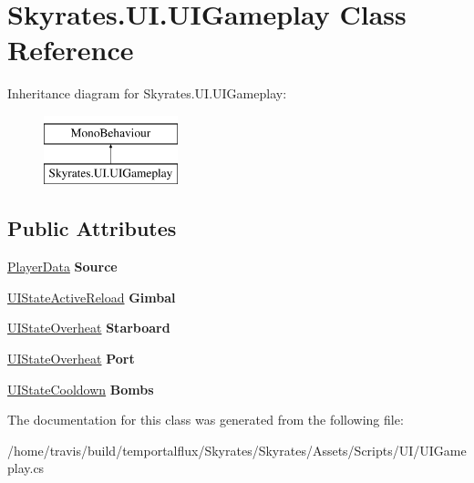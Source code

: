 \hypertarget{class_skyrates_1_1_u_i_1_1_u_i_gameplay}{\section{Skyrates.\-U\-I.\-U\-I\-Gameplay Class Reference}
\label{class_skyrates_1_1_u_i_1_1_u_i_gameplay}
}
Inheritance diagram for Skyrates.\-U\-I.\-U\-I\-Gameplay\-:\begin{figure}[H]
\begin{center}
\leavevmode
\includegraphics[height=2.000000cm]{class_skyrates_1_1_u_i_1_1_u_i_gameplay}
\end{center}
\end{figure}
\subsection*{Public Attributes}
\begin{DoxyCompactItemize}
\item 
\hypertarget{class_skyrates_1_1_u_i_1_1_u_i_gameplay_a4770e7e5a4ebc0922769fa4f42c1c565}{\hyperlink{class_skyrates_1_1_data_1_1_player_data}{Player\-Data} {\bfseries Source}}\label{class_skyrates_1_1_u_i_1_1_u_i_gameplay_a4770e7e5a4ebc0922769fa4f42c1c565}

\item 
\hypertarget{class_skyrates_1_1_u_i_1_1_u_i_gameplay_aeff98598be08416c64c7fbb642842b1b}{\hyperlink{class_skyrates_1_1_u_i_1_1_u_i_state_active_reload}{U\-I\-State\-Active\-Reload} {\bfseries Gimbal}}\label{class_skyrates_1_1_u_i_1_1_u_i_gameplay_aeff98598be08416c64c7fbb642842b1b}

\item 
\hypertarget{class_skyrates_1_1_u_i_1_1_u_i_gameplay_afa0b6d84a3974573ed8947861aa729b7}{\hyperlink{class_u_i_state_overheat}{U\-I\-State\-Overheat} {\bfseries Starboard}}\label{class_skyrates_1_1_u_i_1_1_u_i_gameplay_afa0b6d84a3974573ed8947861aa729b7}

\item 
\hypertarget{class_skyrates_1_1_u_i_1_1_u_i_gameplay_a27408a1e88b330ccfb6464c4515e660a}{\hyperlink{class_u_i_state_overheat}{U\-I\-State\-Overheat} {\bfseries Port}}\label{class_skyrates_1_1_u_i_1_1_u_i_gameplay_a27408a1e88b330ccfb6464c4515e660a}

\item 
\hypertarget{class_skyrates_1_1_u_i_1_1_u_i_gameplay_acb4a9a3ec9edd658ab4b4de8fb4cd7f3}{\hyperlink{class_skyrates_1_1_u_i_1_1_u_i_state_cooldown}{U\-I\-State\-Cooldown} {\bfseries Bombs}}\label{class_skyrates_1_1_u_i_1_1_u_i_gameplay_acb4a9a3ec9edd658ab4b4de8fb4cd7f3}

\end{DoxyCompactItemize}


The documentation for this class was generated from the following file\-:\begin{DoxyCompactItemize}
\item 
/home/travis/build/temportalflux/\-Skyrates/\-Skyrates/\-Assets/\-Scripts/\-U\-I/U\-I\-Gameplay.\-cs\end{DoxyCompactItemize}
